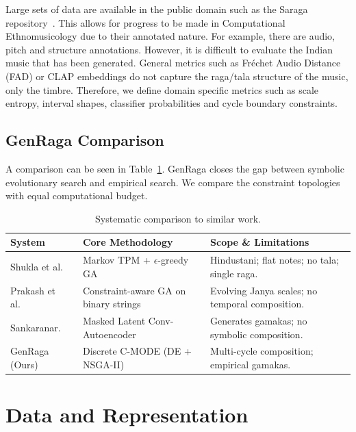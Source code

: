 \documentclass[conference,letterpaper]{IEEEtran}
\begin{document}
Large sets of data are available in the public domain such as the Saraga repository~\cite{saraga2021}. This allows for progress to be made in Computational Ethnomusicology due to their annotated nature. For example, there are audio, pitch and structure annotations. However, it is difficult to evaluate the Indian music that has been generated. General metrics such as Fr{\'e}chet Audio Distance (FAD) or CLAP embeddings do not capture the raga/tala structure of the music, only the timbre. Therefore, we define domain specific metrics such as scale entropy, interval shapes, classifier probabilities and cycle boundary constraints.

\subsection{GenRaga Comparison}
A comparison can be seen in Table~\ref{tab:related}. GenRaga closes the gap between symbolic evolutionary search and empirical search. We compare the constraint topologies with equal computational budget.

\begin{table}[t]
\caption{Systematic comparison to similar work.}
\label{tab:related}
\centering\footnotesize
\begin{tabular}{@{}>{\raggedright\arraybackslash}p{}>{\raggedright\arraybackslash}p{}>{\raggedright\arraybackslash}p{}@{}}
\toprule
System & Core Methodology & Scope \& Limitations\\
\midrule
Shukla et al.~\cite{shukla2023} & Markov TPM + $\epsilon$-greedy GA & Hindustani; flat notes; no tala; single raga.\\
Prakash et al.~\cite{prakash2026} & Constraint-aware GA on binary strings & Evolving Janya scales; no temporal composition.\\
Sankaranar.~\cite{gamaka2022,gamaka2025} & Masked Latent Conv-Autoencoder & Generates gamakas; no symbolic composition.\\
GenRaga (Ours) & Discrete C-MODE (DE + NSGA-II) & Multi-cycle composition; empirical gamakas.\\
\bottomrule
\end{tabular}
\end{table}

\section{Data and Representation}
\end{document}
